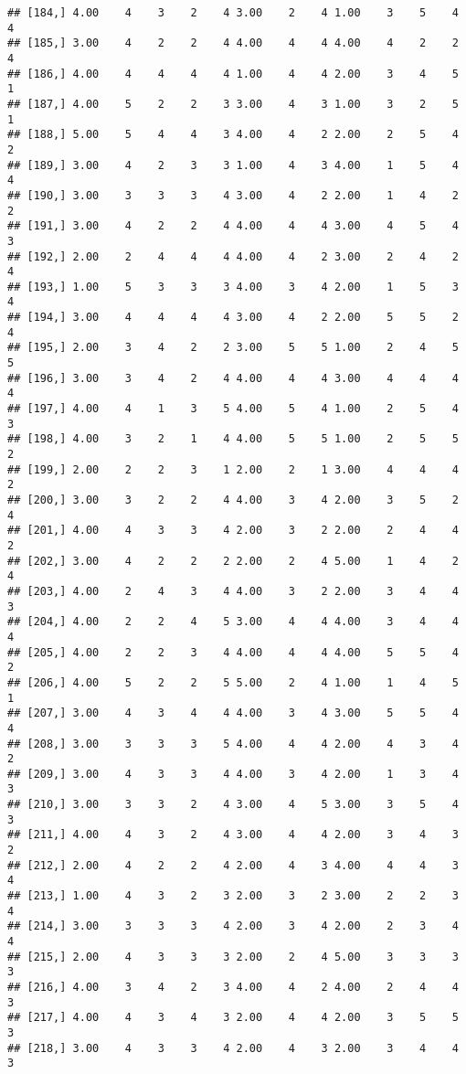 \documentclass[]{article}
\begin{document}
\begin{verbatim}
## [184,] 4.00    4    3    2    4 3.00    2    4 1.00    3    5    4    4
## [185,] 3.00    4    2    2    4 4.00    4    4 4.00    4    2    2    4
## [186,] 4.00    4    4    4    4 1.00    4    4 2.00    3    4    5    1
## [187,] 4.00    5    2    2    3 3.00    4    3 1.00    3    2    5    1
## [188,] 5.00    5    4    4    3 4.00    4    2 2.00    2    5    4    2
## [189,] 3.00    4    2    3    3 1.00    4    3 4.00    1    5    4    4
## [190,] 3.00    3    3    3    4 3.00    4    2 2.00    1    4    2    2
## [191,] 3.00    4    2    2    4 4.00    4    4 3.00    4    5    4    3
## [192,] 2.00    2    4    4    4 4.00    4    2 3.00    2    4    2    4
## [193,] 1.00    5    3    3    3 4.00    3    4 2.00    1    5    3    4
## [194,] 3.00    4    4    4    4 3.00    4    2 2.00    5    5    2    4
## [195,] 2.00    3    4    2    2 3.00    5    5 1.00    2    4    5    5
## [196,] 3.00    3    4    2    4 4.00    4    4 3.00    4    4    4    4
## [197,] 4.00    4    1    3    5 4.00    5    4 1.00    2    5    4    3
## [198,] 4.00    3    2    1    4 4.00    5    5 1.00    2    5    5    2
## [199,] 2.00    2    2    3    1 2.00    2    1 3.00    4    4    4    2
## [200,] 3.00    3    2    2    4 4.00    3    4 2.00    3    5    2    4
## [201,] 4.00    4    3    3    4 2.00    3    2 2.00    2    4    4    2
## [202,] 3.00    4    2    2    2 2.00    2    4 5.00    1    4    2    4
## [203,] 4.00    2    4    3    4 4.00    3    2 2.00    3    4    4    3
## [204,] 4.00    2    2    4    5 3.00    4    4 4.00    3    4    4    4
## [205,] 4.00    2    2    3    4 4.00    4    4 4.00    5    5    4    2
## [206,] 4.00    5    2    2    5 5.00    2    4 1.00    1    4    5    1
## [207,] 3.00    4    3    4    4 4.00    3    4 3.00    5    5    4    4
## [208,] 3.00    3    3    3    5 4.00    4    4 2.00    4    3    4    2
## [209,] 3.00    4    3    3    4 4.00    3    4 2.00    1    3    4    3
## [210,] 3.00    3    3    2    4 3.00    4    5 3.00    3    5    4    3
## [211,] 4.00    4    3    2    4 3.00    4    4 2.00    3    4    3    2
## [212,] 2.00    4    2    2    4 2.00    4    3 4.00    4    4    3    4
## [213,] 1.00    4    3    2    3 2.00    3    2 3.00    2    2    3    4
## [214,] 3.00    3    3    3    4 2.00    3    4 2.00    2    3    4    4
## [215,] 2.00    4    3    3    3 2.00    2    4 5.00    3    3    3    3
## [216,] 4.00    3    4    2    3 4.00    4    2 4.00    2    4    4    3
## [217,] 4.00    4    3    4    3 2.00    4    4 2.00    3    5    5    3
## [218,] 3.00    4    3    3    4 2.00    4    3 2.00    3    4    4    3

\end{verbatim}
\end{document}
